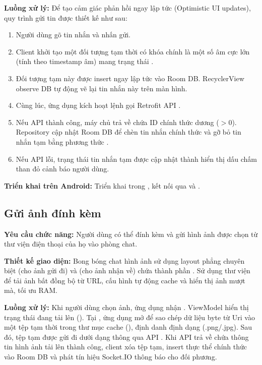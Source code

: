 \textbf{Luồng xử lý:} Để tạo cảm giác phản hồi ngay lập tức (Optimistic UI updates), quy trình gửi tin được thiết kế như sau:
\begin{enumerate}
    \item Người dùng gõ tin nhắn và nhấn gửi.
    \item Client khởi tạo một đối tượng  tạm thời có khóa chính là một số âm cực lớn (tính theo timestamp âm) mang trạng thái .
    \item Đối tượng tạm này được insert ngay lập tức vào Room DB. RecyclerView observe DB tự động vẽ lại tin nhắn này trên màn hình.
    \item Cùng lúc, ứng dụng kích hoạt lệnh gọi Retrofit API .
    \item Nếu API thành công, máy chủ trả về  chứa ID chính thức dương ($>0$). Repository cập nhật Room DB để chèn tin nhắn chính thức và gỡ bỏ tin nhắn tạm bằng phương thức .
    \item Nếu API lỗi, trạng thái tin nhắn tạm được cập nhật thành  hiển thị dấu chấm than đỏ cảnh báo người dùng.
\end{enumerate}

\textbf{Triển khai trên Android:} Triển khai trong ,  kết nối qua  và .

\subsection{Gửi ảnh đính kèm}
\textbf{Yêu cầu chức năng:} Người dùng có thể đính kèm và gửi hình ảnh được chọn từ thư viện điện thoại của họ vào phòng chat.

\textbf{Thiết kế giao diện:} Bong bóng chat hình ảnh sử dụng layout phẳng chuyên biệt  (cho ảnh gửi đi) và  (cho ảnh nhận về) chứa thành phần . Sử dụng thư viện  để tải ảnh bất đồng bộ từ URL, cấu hình tự động cache và hiển thị ảnh mượt mà, tối ưu RAM.

\textbf{Luồng xử lý:} Khi người dùng chọn ảnh, ứng dụng nhận . ViewModel hiển thị trạng thái đang tải lên (). Tại , ứng dụng mở  để sao chép dữ liệu byte từ Uri vào một tệp tạm thời trong thư mục cache (), định danh định dạng (.png/.jpg). Sau đó, tệp tạm được gửi đi dưới dạng  thông qua API . Khi API trả về  chứa thông tin hình ảnh tải lên thành công, client xóa tệp tạm, insert thực thể chính thức vào Room DB và phát tín hiệu Socket.IO thông báo cho đối phương.


